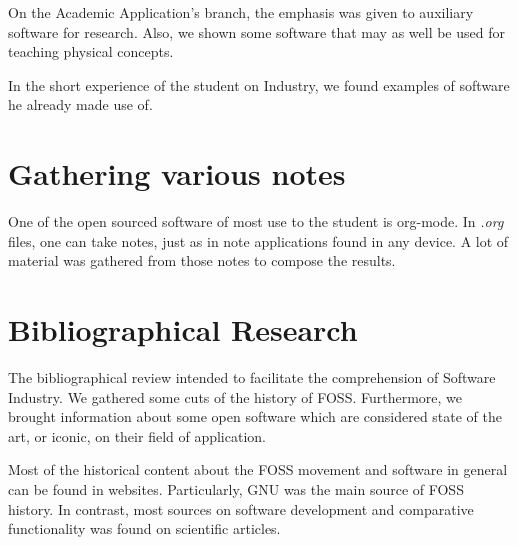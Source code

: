 \documentclass[
12pt,				%
openright,			%
oneside,			%
a4paper,			%
brazil,				%
english,			%
]{abntex2}
\begin{document}
On the Academic Application's branch, the emphasis was given to
auxiliary software for research. Also, we shown some software that may
as well be used for teaching physical concepts. 

In the short experience of the student on Industry, we found examples
of software he already made use of.

\section{Gathering various notes}

One of the open sourced software of most use to the student is
org-mode. In \textit{.org} files, one can take notes, just as in note
applications found in any device. A lot of material was gathered from
those notes to compose the results.

\section{Bibliographical Research}
The bibliographical review intended to facilitate the comprehension of
Software Industry. We gathered some cuts of the history of
FOSS. Furthermore, we brought information about some open software
which are considered state of the art, or iconic, on their field of application.

Most of the historical content about the FOSS movement and software in
general can be found in websites. Particularly, GNU was the main
source of FOSS history. In contrast, most sources on software
development and comparative functionality was found on scientific articles.
\end{document}
